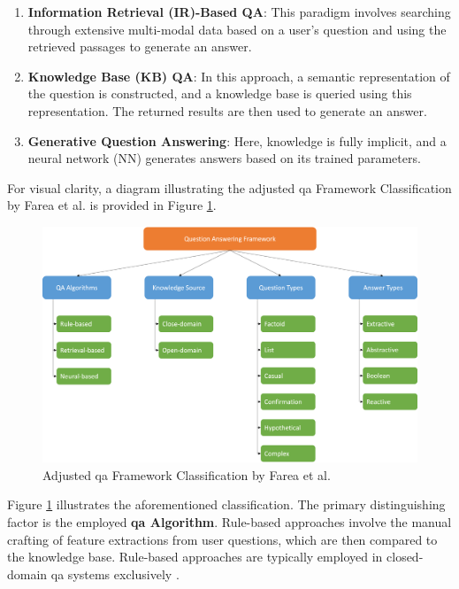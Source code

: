 \begin{enumerate}
    \item \textbf{Information Retrieval (IR)-Based QA}: This paradigm involves searching through extensive multi-modal data based on a user's question and using the retrieved passages to generate an answer.
    
    \item \textbf{Knowledge Base (KB) QA}: In this approach, a semantic representation of the question is constructed, and a knowledge base is queried using this representation. The returned results are then used to generate an answer.
    
    \item \textbf{Generative Question Answering}: Here, knowledge is fully implicit, and a neural network (NN) generates answers based on its trained parameters.

\end{enumerate}

For visual clarity, a diagram illustrating the adjusted \gls{qa} Framework Classification by Farea et al. is provided in Figure \ref{fig:qa_classification}.

\begin{figure}
    \centering
    \includegraphics[width=\textwidth]{Grafiken/QA_Framework.png}
    \caption{Adjusted \gls{qa} Framework Classification by Farea et al. \cite{farea_evaluation_2022}}
    \label{fig:qa_classification}
\end{figure}


Figure \ref{fig:qa_classification} illustrates the aforementioned classification. The primary distinguishing factor is the employed \textbf{\gls{qa} Algorithm}. Rule-based approaches involve the manual crafting of feature extractions from user questions, which are then compared to the knowledge base. Rule-based approaches are typically employed in closed-domain \gls{qa} systems exclusively \cite{etezadi_state_2023}.

